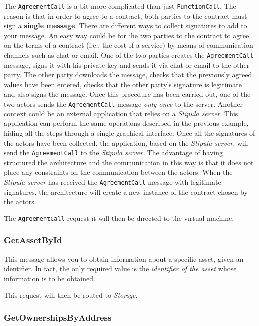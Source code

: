 \begin{enumerate}
  The \verb|AgreementCall| is a bit more complicated than just \verb|FunctionCall|. The reason is that in 
  order to agree to a contract, both parties to the contract must sign a \textbf{single message}. There 
  are different ways to collect signatures to add to your message. An easy way could be for the two 
  parties to the contract to agree on the terms of a contract (i.e., the cost of a service) by means of 
  communication channels such as chat or email. One of the two parties creates the \verb|AgreementCall| 
  message, signs it with his private key and sends it via chat or email to the other party. The other 
  party downloads the message, checks that the previously agreed values have been entered, checks that 
  the other party's signature is legitimate and also signs the message. Once this procedure has been 
  carried out, one of the two actors sends the \verb|AgreementCall| message \textit{only once} to the 
  server. Another context could be an external application that relies on a \textit{Stipula server}. This 
  application can perform the same operations described in the previous example, hiding all the steps 
  through a single graphical interface. Once all the signatures of the actors have been collected, the 
  application, based on the \textit{Stipula server}, will send the \verb|AgreementCall| to the 
  \textit{Stipula server}. The advantage of having structured the architecture and the communication in 
  this way is that it does not place any constraints on the communication between the actors. When the 
  \textit{Stipula server} has received the \verb|AgreementCall| message with legitimate signatures, the 
  architecture will create a new instance of the contract chosen by the actors.

  The \verb|AgreementCall| request it will then be directed to the virtual machine.
\end{enumerate}

\subsubsection{GetAssetById}

This message allows you to obtain information about a specific asset, given an identifier. In fact, the 
only required value is the \textit{identifier of the asset} whose information is to be obtained.

This request will then be routed to \textit{Storage}.

\subsubsection{GetOwnershipsByAddress}

